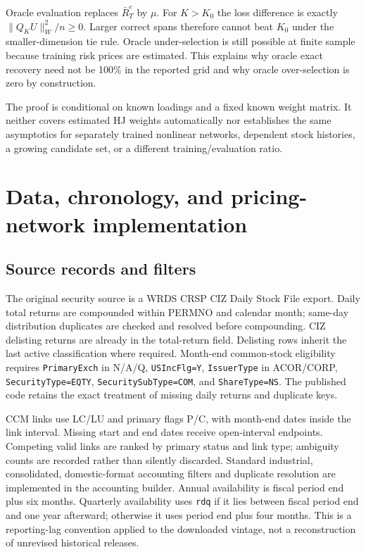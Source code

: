 \documentclass[11pt]{article}
\begin{document}
Oracle evaluation replaces $\bar R_T^e$ by $\mu$. For $K>K_0$ the loss difference is exactly $\|Q_KU\|_W^2/n\ge0$. Larger correct spans therefore cannot beat $K_0$ under the smaller-dimension tie rule. Oracle under-selection is still possible at finite sample because training risk prices are estimated. This explains why oracle exact recovery need not be 100\% in the reported grid and why oracle over-selection is zero by construction.

The proof is conditional on known loadings and a fixed known weight matrix. It neither covers estimated HJ weights automatically nor establishes the same asymptotics for separately trained nonlinear networks, dependent stock histories, a growing candidate set, or a different training/evaluation ratio.

\section{Data, chronology, and pricing-network implementation}
\setcounter{equation}{0}
\subsection{Source records and filters}
The original security source is a WRDS CRSP CIZ Daily Stock File export. Daily total returns are compounded within PERMNO and calendar month; same-day distribution duplicates are checked and resolved before compounding. CIZ delisting returns are already in the total-return field. Delisting rows inherit the last active classification where required. Month-end common-stock eligibility requires \texttt{PrimaryExch} in N/A/Q, \texttt{USIncFlg=Y}, \texttt{IssuerType} in ACOR/CORP, \texttt{SecurityType=EQTY}, \texttt{SecuritySubType=COM}, and \texttt{ShareType=NS}. The published code retains the exact treatment of missing daily returns and duplicate keys.

CCM links use LC/LU and primary flags P/C, with month-end dates inside the link interval. Missing start and end dates receive open-interval endpoints. Competing valid links are ranked by primary status and link type; ambiguity counts are recorded rather than silently discarded. Standard industrial, consolidated, domestic-format accounting filters and duplicate resolution are implemented in the accounting builder. Annual availability is fiscal period end plus six months. Quarterly availability uses \texttt{rdq} if it lies between fiscal period end and one year afterward; otherwise it uses period end plus four months. This is a reporting-lag convention applied to the downloaded vintage, not a reconstruction of unrevised historical releases.
\end{document}
